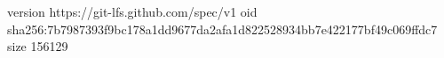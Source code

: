 version https://git-lfs.github.com/spec/v1
oid sha256:7b7987393f9bc178a1dd9677da2afa1d822528934bb7e422177bf49c069ffdc7
size 156129
